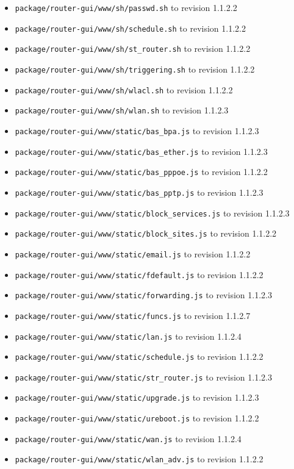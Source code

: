 \documentclass[12pt]{report}
\begin{document}
\begin{itemize}
\begin{enumerate}
\begin{itemize}
	\item \texttt{package/router-gui/www/sh/passwd.sh} to revision 1.1.2.2
	\item \texttt{package/router-gui/www/sh/schedule.sh} to revision 1.1.2.2
	\item \texttt{package/router-gui/www/sh/st\_router.sh} to revision 1.1.2.2
	\item \texttt{package/router-gui/www/sh/triggering.sh} to revision 1.1.2.2
	\item \texttt{package/router-gui/www/sh/wlacl.sh} to revision 1.1.2.2
	\item \texttt{package/router-gui/www/sh/wlan.sh} to revision 1.1.2.3
	\item \texttt{package/router-gui/www/static/bas\_bpa.js} to revision 1.1.2.3
	\item \texttt{package/router-gui/www/static/bas\_ether.js} to revision 1.1.2.3
	\item \texttt{package/router-gui/www/static/bas\_pppoe.js} to revision 1.1.2.2
	\item \texttt{package/router-gui/www/static/bas\_pptp.js} to revision 1.1.2.3
	\item \texttt{package/router-gui/www/static/block\_services.js} to revision 1.1.2.3
	\item \texttt{package/router-gui/www/static/block\_sites.js} to revision 1.1.2.2
	\item \texttt{package/router-gui/www/static/email.js} to revision 1.1.2.2
	\item \texttt{package/router-gui/www/static/fdefault.js} to revision 1.1.2.2
	\item \texttt{package/router-gui/www/static/forwarding.js} to revision 1.1.2.3
	\item \texttt{package/router-gui/www/static/funcs.js} to revision 1.1.2.7
	\item \texttt{package/router-gui/www/static/lan.js} to revision 1.1.2.4
	\item \texttt{package/router-gui/www/static/schedule.js} to revision 1.1.2.2
	\item \texttt{package/router-gui/www/static/str\_router.js} to revision 1.1.2.3
	\item \texttt{package/router-gui/www/static/upgrade.js} to revision 1.1.2.3
	\item \texttt{package/router-gui/www/static/ureboot.js} to revision 1.1.2.2
	\item \texttt{package/router-gui/www/static/wan.js} to revision 1.1.2.4
	\item \texttt{package/router-gui/www/static/wlan\_adv.js} to revision 1.1.2.2

\end{itemize}
\end{enumerate}
\end{itemize}
\end{document}
